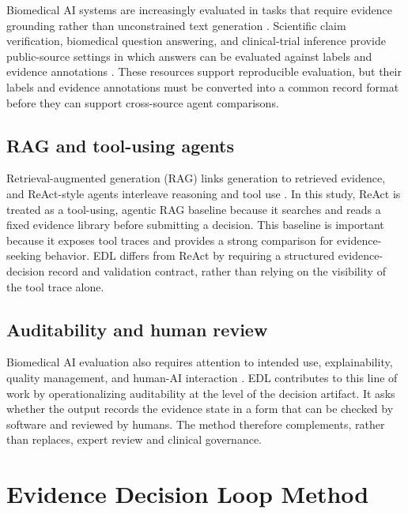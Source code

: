 \documentclass[11pt,a4paper]{article}
\begin{document}
Biomedical AI systems are increasingly evaluated in tasks that require evidence grounding rather than unconstrained text generation \cite{rajpurkar2022health,topol2019highperformance,esteva2019deep}. Scientific claim verification, biomedical question answering, and clinical-trial inference provide public-source settings in which answers can be evaluated against labels and evidence annotations \cite{wadden2020scifact,jin2019pubmedqa,jullien2023nli4ct}. These resources support reproducible evaluation, but their labels and evidence annotations must be converted into a common record format before they can support cross-source agent comparisons.

\subsection{RAG and tool-using agents}

Retrieval-augmented generation (RAG) links generation to retrieved evidence, and ReAct-style agents interleave reasoning and tool use \cite{lewis2020rag,yao2023react}. In this study, ReAct is treated as a tool-using, agentic RAG baseline because it searches and reads a fixed evidence library before submitting a decision. This baseline is important because it exposes tool traces and provides a strong comparison for evidence-seeking behavior. EDL differs from ReAct by requiring a structured evidence-decision record and validation contract, rather than relying on the visibility of the tool trace alone.

\subsection{Auditability and human review}

Biomedical AI evaluation also requires attention to intended use, explainability, quality management, and human-AI interaction \cite{mcnamara2024clinicianai,overgaard2023qms,castner2024expertgaze,wekenborg2025humanai}. EDL contributes to this line of work by operationalizing auditability at the level of the decision artifact. It asks whether the output records the evidence state in a form that can be checked by software and reviewed by humans. The method therefore complements, rather than replaces, expert review and clinical governance.

\section{Evidence Decision Loop Method}
\end{document}
